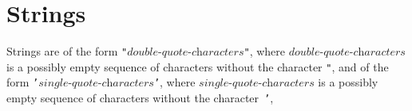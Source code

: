 \section*{Strings}

Strings are of the form \texttt{"}$ \textit{double-quote-characters} $\texttt{"},
where $\textit{double-quote-characters}$ is a possibly empty sequence of characters without
the character \texttt{"}, 
and of the form
\texttt{'}$ \textit{single-quote-characters} $\texttt{'},
where $\textit{single-quote-characters}$ is a possibly empty sequence of characters without
the character~\texttt{'}, 
